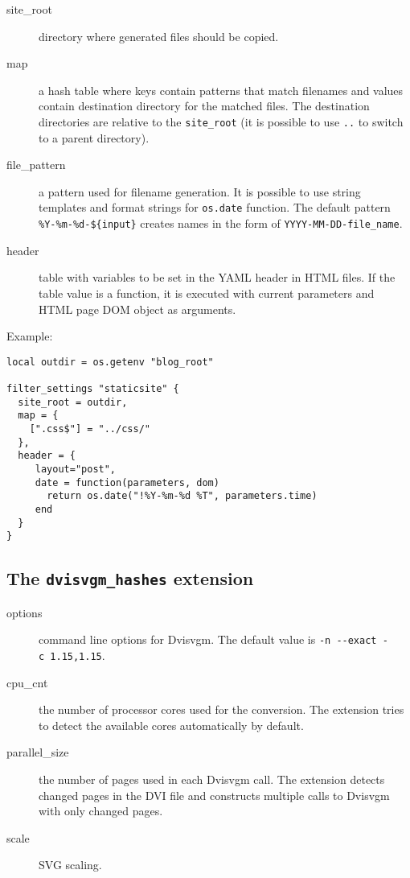 \begin{description}
\item[site\_root]
directory where generated files should be copied.
\item[map]
a hash table where keys contain patterns that match filenames and values
contain destination directory for the matched files. The destination
directories are relative to the \texttt{site\_root} (it is possible to
use \texttt{..} to switch to a parent directory).
\item[file\_pattern]
a pattern used for filename generation. It is possible to use string
templates and format strings for \texttt{os.date} function. The default
pattern \texttt{\%Y-\%m-\%d-\$\{input\}} creates names in the form of
\texttt{YYYY-MM-DD-file\_name}.
\item[header]
table with variables to be set in the YAML header in HTML files. If the
table value is a function, it is executed with current parameters and
HTML page DOM object as arguments.
\end{description}

Example:

\begin{verbatim}
local outdir = os.getenv "blog_root" 

filter_settings "staticsite" {
  site_root = outdir, 
  map = {
    [".css$"] = "../css/"
  },
  header = {
     layout="post",
     date = function(parameters, dom)
       return os.date("!%Y-%m-%d %T", parameters.time)
     end
  }
}
\end{verbatim}

\hypertarget{the-dvisvgm_hashes-extension}{%
\subsection{\texorpdfstring{The \texttt{dvisvgm\_hashes}
extension}{The dvisvgm\_hashes extension}}\label{the-dvisvgm_hashes-extension}}

\begin{description}
\item[options]
command line options for Dvisvgm. The default value is
\texttt{-n\ -\/-exact\ -c\ 1.15,1.15}.
\item[cpu\_cnt]
the number of processor cores used for the conversion. The extension
tries to detect the available cores automatically by default.
\item[parallel\_size]
the number of pages used in each Dvisvgm call. The extension detects
changed pages in the DVI file and constructs multiple calls to Dvisvgm
with only changed pages.
\item[scale]
SVG scaling.
\end{description}

